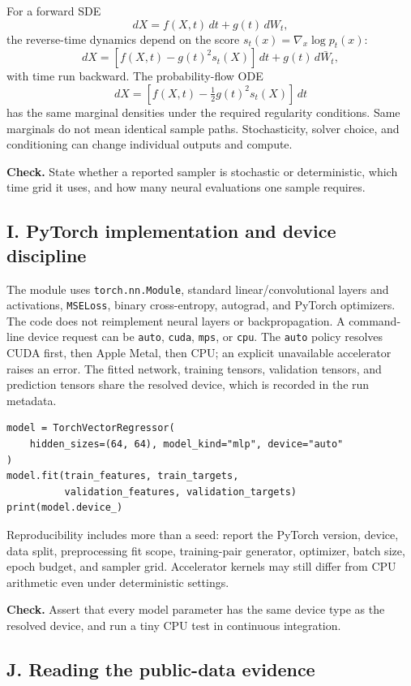 \documentclass[11pt]{article}
\newcommand{\code}[1]{\texttt{#1}}
\begin{document}
For a forward SDE
\[
 dX=f(X,t)\,dt+g(t)\,dW_t,
\]
the reverse-time dynamics depend on the score $s_t(x)=\nabla_x\log p_t(x)$:
\[
 dX=[f(X,t)-g(t)^2s_t(X)]\,dt+g(t)\,d\bar W_t,
\]
with time run backward. The probability-flow ODE
\[
 dX=[f(X,t)-\tfrac12g(t)^2s_t(X)]\,dt
\]
has the same marginal densities under the required regularity conditions. Same
marginals do not mean identical sample paths. Stochasticity, solver choice, and
conditioning can change individual outputs and compute.

\textbf{Check.} State whether a reported sampler is stochastic or deterministic,
which time grid it uses, and how many neural evaluations one sample requires.

\subsection*{I. PyTorch implementation and device discipline}

The module uses \code{torch.nn.Module}, standard linear/convolutional layers and
activations, \code{MSELoss}, binary cross-entropy, autograd, and PyTorch
optimizers.
The code does not reimplement neural layers or backpropagation. A command-line
device request can be \code{auto}, \code{cuda}, \code{mps}, or \code{cpu}.
The \code{auto} policy resolves CUDA first, then Apple Metal, then CPU; an
explicit unavailable accelerator raises an error. The fitted network, training
tensors, validation tensors, and prediction tensors share the resolved device,
which is recorded in the run metadata.

\begin{verbatim}
model = TorchVectorRegressor(
    hidden_sizes=(64, 64), model_kind="mlp", device="auto"
)
model.fit(train_features, train_targets,
          validation_features, validation_targets)
print(model.device_)
\end{verbatim}

Reproducibility includes more than a seed: report the PyTorch version, device,
data split, preprocessing fit scope, training-pair generator, optimizer, batch
size, epoch budget, and sampler grid. Accelerator kernels may still differ from
CPU arithmetic even under deterministic settings.

\textbf{Check.} Assert that every model parameter has the same device type as
the resolved device, and run a tiny CPU test in continuous integration.

\subsection*{J. Reading the public-data evidence}
\end{document}

